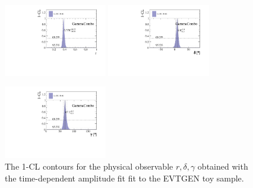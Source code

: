\begin{figure}[h]
	\centering
		\includegraphics[width=0.4\textwidth, height = !]{figs/GammaCombo/signal_DsKpipi_CPV_MC/cartesian_GenMC_r.pdf} 		
		\includegraphics[width=0.4\textwidth, height = !]{figs/GammaCombo/signal_DsKpipi_CPV_MC/cartesian_GenMC_d.pdf} 
		
		\includegraphics[width=0.4\textwidth, height = !]{figs/GammaCombo/signal_DsKpipi_CPV_MC/cartesian_GenMC_g.pdf} 
		\caption{The 1-CL contours for the physical observable $r,\delta,\gamma$ obtained with the time-dependent amplitude fit fit to the \textsf{EVTGEN} toy sample. } 	
\end{figure}  
    
